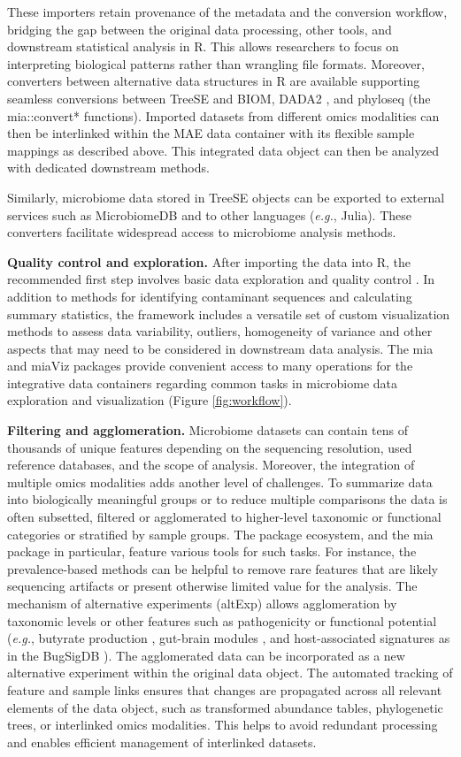 \documentclass[
  sn-nature,
]{sn-jnl}
\begin{document}
These importers retain provenance of the metadata and the conversion
workflow, bridging the gap between the original data processing, other
tools, and downstream statistical analysis in R. This allows researchers
to focus on interpreting biological patterns rather than wrangling file
formats. Moreover, converters between alternative data structures in R
are available supporting seamless conversions between TreeSE and BIOM,
DADA2 \citep{callahan2016}, and phyloseq (the mia::convert* functions).
Imported datasets from different omics modalities can then be
interlinked within the MAE data container with its flexible sample
mappings as described above. This integrated data object can then be
analyzed with dedicated downstream methods.

Similarly, microbiome data stored in TreeSE objects can be exported to
external services such as MicrobiomeDB \citep{oliveira2018} and to other
languages (\emph{e.g.}, Julia). These converters facilitate widespread
access to microbiome analysis methods.

\textbf{Quality control and exploration.} After importing the data into
R, the recommended first step involves basic data exploration and
quality control \citep{zuur2010}. In addition to methods for identifying
contaminant sequences and calculating summary statistics, the framework
includes a versatile set of custom visualization methods to assess data
variability, outliers, homogeneity of variance and other aspects that
may need to be considered in downstream data analysis. The mia and
miaViz packages provide convenient access to many operations for the
integrative data containers regarding common tasks in microbiome data
exploration and visualization (Figure \ref{fig:workflow}).

\textbf{Filtering and agglomeration.} Microbiome datasets can contain
tens of thousands of unique features depending on the sequencing
resolution, used reference databases, and the scope of analysis.
Moreover, the integration of multiple omics modalities adds another
level of challenges. To summarize data into biologically meaningful
groups or to reduce multiple comparisons the data is often subsetted,
filtered or agglomerated to higher-level taxonomic or functional
categories or stratified by sample groups. The package ecosystem, and
the mia package in particular, feature various tools for such tasks. For
instance, the prevalence-based methods can be helpful to remove rare
features that are likely sequencing artifacts or present otherwise
limited value for the analysis. The mechanism of alternative experiments
(altExp) allows agglomeration by taxonomic levels or other features such
as pathogenicity or functional potential (\emph{e.g.}, butyrate
production \citep{kullberg2024}, gut-brain modules
\citep{vallescolomer2019}, and host-associated signatures as in the
BugSigDB \citep{geistlinger2024}). The agglomerated data can be
incorporated as a new alternative experiment within the original data
object. The automated tracking of feature and sample links ensures that
changes are propagated across all relevant elements of the data object,
such as transformed abundance tables, phylogenetic trees, or interlinked
omics modalities. This helps to avoid redundant processing and enables
efficient management of interlinked datasets.
\end{document}
